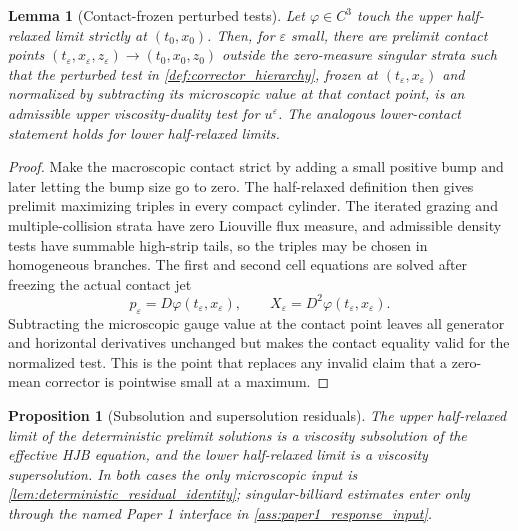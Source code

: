 \documentclass[11pt]{amsart}
\newtheorem{proposition}[theorem]{Proposition}
\newtheorem{lemma}[theorem]{Lemma}
\theoremstyle{definition}
\theoremstyle{remark}
\begin{document}
\begin{lemma}[Contact-frozen perturbed tests]
\label{lem:contact_frozen_perturbed_tests}
Let $\varphi\in C^3$ touch the upper half-relaxed limit strictly at
$(t_0,x_0)$.  Then, for $\varepsilon$ small, there are prelimit contact points
$(t_\varepsilon,x_\varepsilon,z_\varepsilon)\to(t_0,x_0,z_0)$ outside the
zero-measure singular strata such that the perturbed test in
\cref{def:corrector_hierarchy}, frozen at
$(t_\varepsilon,x_\varepsilon)$ and normalized by subtracting its microscopic
value at that contact point, is an admissible upper viscosity-duality test for
$u^\varepsilon$.  The analogous lower-contact statement holds for lower
half-relaxed limits.
\end{lemma}

\begin{proof}
Make the macroscopic contact strict by adding a small positive bump and later
letting the bump size go to zero.  The half-relaxed definition then gives
prelimit maximizing triples in every compact cylinder.  The iterated grazing and
multiple-collision strata have zero Liouville flux measure, and admissible
density tests have summable high-strip tails, so the triples may be chosen in
homogeneous branches.  The first and second cell equations are solved after
freezing the actual contact jet
\[
  p_\varepsilon=D\varphi(t_\varepsilon,x_\varepsilon),\qquad
  X_\varepsilon=D^2\varphi(t_\varepsilon,x_\varepsilon).
\]
Subtracting the microscopic gauge value at the contact point leaves all
generator and horizontal derivatives unchanged but makes the contact equality
valid for the normalized test.  This is the point that replaces any invalid
claim that a zero-mean corrector is pointwise small at a maximum.
\end{proof}

\begin{proposition}[Subsolution and supersolution residuals]
\label{prop:subsuper_residuals}
The upper half-relaxed limit of the deterministic prelimit solutions is a
viscosity subsolution of the effective HJB equation, and the lower half-relaxed
limit is a viscosity supersolution.  In both cases the only microscopic input
is \cref{lem:deterministic_residual_identity}; singular-billiard estimates enter
only through the named Paper 1 interface in \cref{ass:paper1_response_input}.
\end{proposition}
\end{document}
